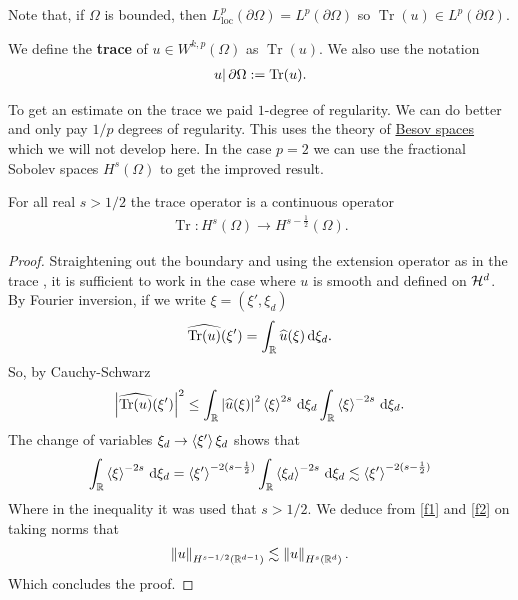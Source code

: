 \documentclass[
    a4paper,
    DIV=14,
    abstract=true,
    numbers=noenddot
]{scrartcl}
\begin{document}
Note that, if $\Omega$ is bounded, then $L^p_{\mathrm{loc}}(\partial \Omega)=L^p(\partial \Omega)$ so $\operatorname{Tr}(u) \in L^p(\partial \Omega)$.

\begin{definition}
	We define the \textbf{trace} of $u \in W^{k,p}(\Omega)$ as $\operatorname{Tr}(u)$. We also use the notation
	\begin{align*}
		\left.u\right|{\partial \Omega}:= \operatorname{Tr}(u).
	\end{align*}
\end{definition}
To get an estimate on the trace we paid $1$-degree of regularity. We can do better and only pay ${1}/{p}$ degrees of regularity. This uses the theory of \href{https://en.wikipedia.org/wiki/Trace_operator#For_p_=_1:~:text=%5Bedit%5D-,A%20more,-concrete%20representation%20of}{Besov spaces} which we will not develop here. In the case $p=2$ we can use the fractional Sobolev spaces $H^s(\Omega)$ to get the improved result.
\begin{theorem}
	For all real $s> 1 /2$ the trace operator is a continuous operator
	\begin{align*}
		\operatorname{Tr}: H^s(\Omega) \to H^{s -\frac{1}{2}}(\Omega).
	\end{align*}
\end{theorem}
\begin{proof}
	Straightening out the boundary and using the extension operator as in the trace , it is sufficient to work in the case where $u$ is smooth and defined on  $\mathcal{H}^{d}$.  By Fourier inversion, if we write $\xi=(\xi',\xi _d) $
	\begin{align*}
		\widehat{\operatorname{Tr}(u)}(\xi ')=\int_{\mathbb{R}}\widehat{u}(\xi) \,\mathrm{d} \xi _d .
	\end{align*}
	So, by Cauchy-Schwarz
	\begin{align}\label{f1}
		{\left| \widehat{\operatorname{Tr}(u)}(\xi ') \right|}^2\leq \int_{\mathbb{R}}{\left| \widehat{u}(\xi) \right|}^2\left\langle\xi \right\rangle^{2s} \,\mathrm{d} \xi _d \int_{\mathbb{R}}\left\langle\xi \right\rangle^{-2s} \,\mathrm{d} \xi _d.
	\end{align}
	The change of variables $\xi _d \to \left\langle\xi '\right\rangle\xi _d$ shows that
	\begin{align}\label{f2}
		\int_{\mathbb{R}}\left\langle\xi \right\rangle^{-2s} \,\mathrm{d} \xi _d=\left\langle\xi' \right\rangle^{-2(s-\frac{1}{2})} \int_{\mathbb{R}}\left\langle\xi _d\right\rangle^{-2s}\,\mathrm{d} \xi _d\lesssim  \left\langle\xi' \right\rangle^{-2(s-\frac{1}{2})}
	\end{align}
	Where in the inequality it was used that $s> 1 /2$.     We deduce from \eqref{f1} and \eqref{f2} on taking norms that
	\begin{align*}
		\left\lVert u \right\rVert_{H^{s-1 /2}(\mathbb{R}^{d-1})} \lesssim  \left\lVert u \right\rVert_{H^s(\mathbb{R}^d)}.
	\end{align*}
	Which concludes the proof.
\end{proof}
\end{document}
